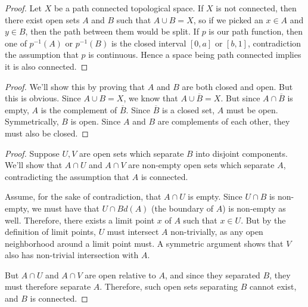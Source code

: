 
\begin{proof}
	
	Let $X$ be a path connected topological space.  If $X$ is not connected, then there exist open sets $A$ and $B$ such that $A\cup B=X$, so if we picked an $x\in A$ and $y\in B$, then the path between them would be split.  If $p$ is our path function, then one of $p^{-1}(A)$ or $p^{-1}(B)$ is the closed interval $[0,a]$ or $[b,1]$, contradiction the assumption that $p$ is continuous.  Hence a space being path connected implies it is also connected.
	
	
\end{proof}



\begin{proof}
	
We'll show this by proving that $A$ and $B$ are both closed and open.  But this is obvious.  Since $A\cup B=X$, we know that $A\cup \overline{B}=X$.  But since $A\cap\overline{B}$ is empty, $A$ is the complement of $\overline{B}$.  Since $\overline{B}$ is a closed set, $A$ must be open.  Symmetrically, $B$ is open.  Since $A$ and $B$ are complements of each other, they must also be closed.	
	
	
	
\end{proof}


\begin{proof}
	Suppose $U,V$ are open sets which separate $B$ into disjoint components.  We'll show that $A\cap U$ and $A\cap V$ are non-empty open sets which separate $A$, contradicting the assumption that $A$ is connected.
	
	Assume, for the sake of contradiction, that $A\cap U$ is empty.  Since $U\cap B$ is non-empty, we must have that $U\cap Bd(A)$ (the boundary of $A$) is non-empty as well.  Therefore, there exists a limit point $x$ of $A$ such that $x\in U$.  But by the definition of limit points, $U$ must intersect $A$ non-trivially, as any open neighborhood around a limit point must.  A symmetric argument shows that $V$ also has non-trivial intersection with $A$.
	
	But $A\cap U$ and $A\cap V$ are open relative to $A$, and since they separated $B$, they must therefore separate $A$.  Therefore, such open sets separating $B$ cannot exist, and $B$ is connected.
	
	
\end{proof}

